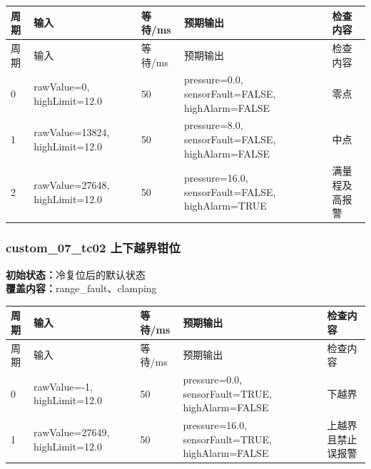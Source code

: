 \begin{longtable}{L{1.0cm}L{4.7cm}L{1.4cm}L{4.0cm}L{2.1cm}}

\toprule

周期 & 输入 & 等待/ms & 预期输出 & 检查内容\\

\midrule

\endfirsthead

\toprule

周期 & 输入 & 等待/ms & 预期输出 & 检查内容\\

\midrule

\endhead

0 & rawValue=0, highLimit=12.0 & 50 & pressure=0.0, sensorFault=FALSE, highAlarm=FALSE & 零点\\

1 & rawValue=13824, highLimit=12.0 & 50 & pressure=8.0, sensorFault=FALSE, highAlarm=FALSE & 中点\\

2 & rawValue=27648, highLimit=12.0 & 50 & pressure=16.0, sensorFault=FALSE, highAlarm=TRUE & 满量程及高报警\\

\bottomrule

\end{longtable}

\subsubsection{{\ttfamily custom\_07\_tc02} 上下越界钳位}

\noindent\textbf{初始状态：}冷复位后的默认状态\\

\textbf{覆盖内容：}range\_fault、clamping

\begin{longtable}{L{1.0cm}L{4.7cm}L{1.4cm}L{4.0cm}L{2.1cm}}

\toprule

周期 & 输入 & 等待/ms & 预期输出 & 检查内容\\

\midrule

\endfirsthead

\toprule

周期 & 输入 & 等待/ms & 预期输出 & 检查内容\\

\midrule

\endhead

0 & rawValue=-1, highLimit=12.0 & 50 & pressure=0.0, sensorFault=TRUE, highAlarm=FALSE & 下越界\\

1 & rawValue=27649, highLimit=12.0 & 50 & pressure=16.0, sensorFault=TRUE, highAlarm=FALSE & 上越界且禁止误报警\\

\bottomrule

\end{longtable}

